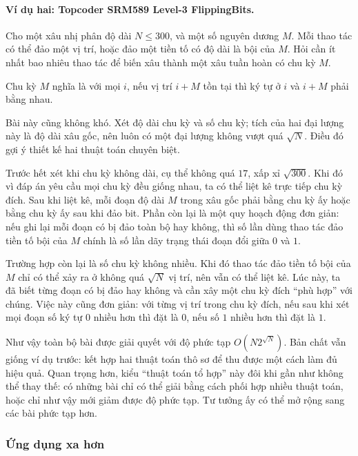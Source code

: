 \documentclass[11pt]{article}
\begin{document}
\paragraph{Ví dụ hai: Topcoder SRM589 Level-3 FlippingBits.}
Cho một xâu nhị phân độ dài \(N\le 300\), và một số nguyên dương \(M\). Mỗi thao
tác có thể đảo một vị trí, hoặc đảo một tiền tố có độ dài là bội của \(M\). Hỏi
cần ít nhất bao nhiêu thao tác để biến xâu thành một xâu tuần hoàn có chu kỳ
\(M\).

Chu kỳ \(M\) nghĩa là với mọi \(i\), nếu vị trí \(i+M\) tồn tại thì ký tự ở
\(i\) và \(i+M\) phải bằng nhau.

Bài này cũng không khó. Xét độ dài chu kỳ và số chu kỳ; tích của hai đại lượng
này là độ dài xâu gốc, nên luôn có một đại lượng không vượt quá \(\sqrt N\).
Điều đó gợi ý thiết kế hai thuật toán chuyên biệt.

Trước hết xét khi chu kỳ không dài, cụ thể không quá \(17\), xấp xỉ
\(\sqrt{300}\). Khi đó vì đáp án yêu cầu mọi chu kỳ đều giống nhau, ta có thể
liệt kê trực tiếp chu kỳ đích. Sau khi liệt kê, mỗi đoạn độ dài \(M\) trong xâu
gốc phải bằng chu kỳ ấy hoặc bằng chu kỳ ấy sau khi đảo bit. Phần còn lại là
một quy hoạch động đơn giản: nếu ghi lại mỗi đoạn có bị đảo toàn bộ hay không,
thì số lần dùng thao tác đảo tiền tố bội của \(M\) chính là số lần dãy trạng
thái đoạn đổi giữa \(0\) và \(1\).

Trường hợp còn lại là số chu kỳ không nhiều. Khi đó thao tác đảo tiền tố bội
của \(M\) chỉ có thể xảy ra ở không quá \(\sqrt N\) vị trí, nên vẫn có thể liệt
kê. Lúc này, ta đã biết từng đoạn có bị đảo hay không và cần xây một chu kỳ
đích ``phù hợp'' với chúng. Việc này cũng đơn giản: với từng vị trí trong chu
kỳ đích, nếu sau khi xét mọi đoạn số ký tự \(0\) nhiều hơn thì đặt là \(0\),
nếu số \(1\) nhiều hơn thì đặt là \(1\).

Như vậy toàn bộ bài được giải quyết với độ phức tạp
\(O(N2^{\sqrt N})\). Bản chất vẫn giống ví dụ trước: kết hợp hai thuật toán
thô sơ để thu được một cách làm đủ hiệu quả. Quan trọng hơn, kiểu ``thuật toán
tổ hợp'' này đôi khi gần như không thể thay thế: có những bài chỉ có thể giải
bằng cách phối hợp nhiều thuật toán, hoặc chỉ như vậy mới giảm được độ phức
tạp. Tư tưởng ấy có thể mở rộng sang các bài phức tạp hơn.

\subsubsection{Ứng dụng xa hơn}
\end{document}
